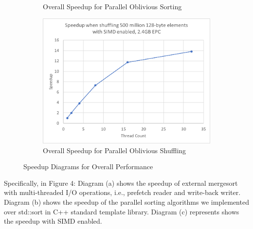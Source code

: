 \documentclass{article}
\begin{document}
\begin{figure}[h]
\begin{subfigure}[b]{0.45\linewidth}
        \caption{Overall Speedup for Parallel Oblivious Sorting}
    \end{subfigure}
    \hfill
    \begin{subfigure}[b]{0.45\linewidth}
        \includegraphics[width=\linewidth]{assets/speedup_shuffle.png}
        \caption{Overall Speedup for Parallel Oblivious Shuffling}
    \end{subfigure}
    \caption{Speedup Diagrams for Overall Performance}
\end{figure}


Specifically, in Figure 4: Diagram (a) shows the speedup of external mergesort with multi-threaded I/O operations, i.e., prefetch reader and write-back writer. Diagram (b) shows the speedup of the parallel sorting algorithms we implemented over std::sort in C++ standard template library. Diagram (c) represents shows the speedup with SIMD enabled. 
\end{document}
